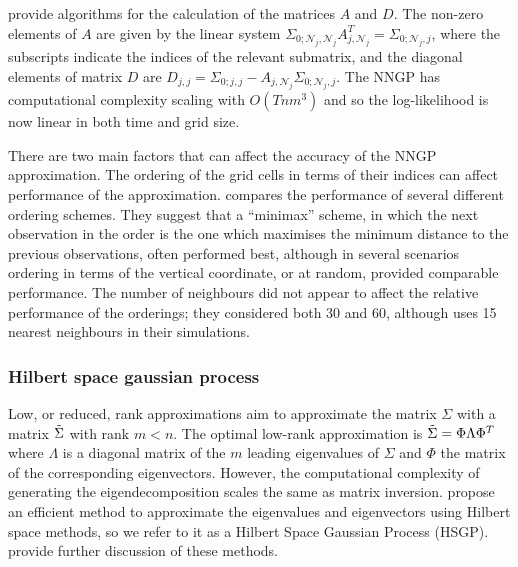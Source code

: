 \citet{Finley2019} provide algorithms for the calculation of the matrices $A$ and $D$. The non-zero elements of $A$ are given by the linear system $\Sigma_{0;\mathcal{N}_j,\mathcal{N}_j}A_{j,\mathcal{N}_j}^T = \Sigma_{0;\mathcal{N}_j,j}$, where the subscripts indicate the indices of the relevant submatrix, and the diagonal elements of matrix $D$ are $D_{j,j} = \Sigma_{0;j,j} -  A_{j,\mathcal{N}_j}\Sigma_{0;\mathcal{N}_j,j}$. The NNGP has computational complexity scaling with $O(Tnm^3)$ and so the log-likelihood is now linear in both time and grid size.


 There are two main factors that can affect the accuracy of the NNGP approximation. The ordering of the grid cells in terms of their indices can affect performance of the approximation. \citet{Guinness2018} compares the performance of several different ordering schemes. They suggest that a ``minimax'' scheme, in which the next observation in the order is the one which maximises the minimum distance to the previous observations, often performed best, although in several scenarios ordering in terms of the vertical coordinate, or at random, provided comparable performance. The number of neighbours did not appear to affect the relative performance of the orderings; they considered both 30 and 60, although \citet{Datta2016} uses 15 nearest neighbours in their simulations.

\subsubsection{Hilbert space gaussian process}
Low, or reduced, rank approximations aim to approximate the matrix $\Sigma$ with a matrix $\Tilde{\Sigma}$ with rank $m < n$. The optimal low-rank approximation is $\Tilde{\Sigma} = \Phi \Lambda \Phi^T$ where $\Lambda$ is a diagonal matrix of the $m$ leading eigenvalues of $\Sigma$ and $\Phi$ the matrix of the corresponding eigenvectors. However, the computational complexity of generating the eigendecomposition scales the same as matrix inversion. \citet{Solin2020} propose an efficient method to approximate the eigenvalues and eigenvectors using Hilbert space methods, so we refer to it as a Hilbert Space Gaussian Process (HSGP). \citet{Riutort2023} provide further discussion of these methods.

